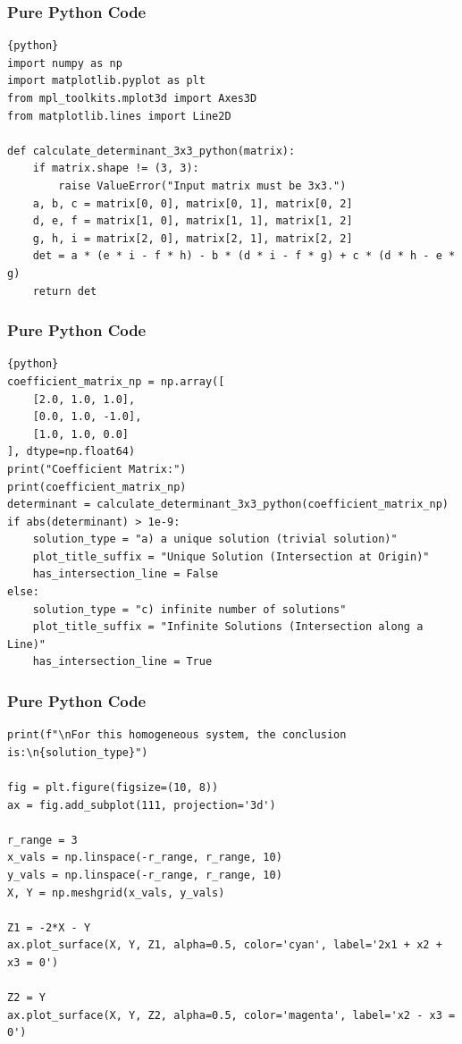 \documentclass{beamer}
\begin{document}
\begin{frame}[fragile]
\frametitle{Pure Python Code}
\begin{lstlisting}{python}
import numpy as np
import matplotlib.pyplot as plt
from mpl_toolkits.mplot3d import Axes3D
from matplotlib.lines import Line2D

def calculate_determinant_3x3_python(matrix):
    if matrix.shape != (3, 3):
        raise ValueError("Input matrix must be 3x3.")
    a, b, c = matrix[0, 0], matrix[0, 1], matrix[0, 2]
    d, e, f = matrix[1, 0], matrix[1, 1], matrix[1, 2]
    g, h, i = matrix[2, 0], matrix[2, 1], matrix[2, 2]
    det = a * (e * i - f * h) - b * (d * i - f * g) + c * (d * h - e * g)
    return det
\end{lstlisting}
\end{frame}

\begin{frame}[fragile]
\frametitle{Pure Python Code}
\begin{lstlisting}{python}
coefficient_matrix_np = np.array([
    [2.0, 1.0, 1.0],
    [0.0, 1.0, -1.0],
    [1.0, 1.0, 0.0]
], dtype=np.float64)
print("Coefficient Matrix:")
print(coefficient_matrix_np)
determinant = calculate_determinant_3x3_python(coefficient_matrix_np)
if abs(determinant) > 1e-9:
    solution_type = "a) a unique solution (trivial solution)"
    plot_title_suffix = "Unique Solution (Intersection at Origin)"
    has_intersection_line = False
else:
    solution_type = "c) infinite number of solutions"
    plot_title_suffix = "Infinite Solutions (Intersection along a Line)"
    has_intersection_line = True
\end{lstlisting}
\end{frame}

\begin{frame}[fragile]
\frametitle{Pure Python Code}
\begin{lstlisting}
print(f"\nFor this homogeneous system, the conclusion is:\n{solution_type}")

fig = plt.figure(figsize=(10, 8))
ax = fig.add_subplot(111, projection='3d')

r_range = 3
x_vals = np.linspace(-r_range, r_range, 10)
y_vals = np.linspace(-r_range, r_range, 10)
X, Y = np.meshgrid(x_vals, y_vals)

Z1 = -2*X - Y
ax.plot_surface(X, Y, Z1, alpha=0.5, color='cyan', label='2x1 + x2 + x3 = 0')

Z2 = Y
ax.plot_surface(X, Y, Z2, alpha=0.5, color='magenta', label='x2 - x3 = 0')
\end{lstlisting}
\end{frame}
\end{document}
